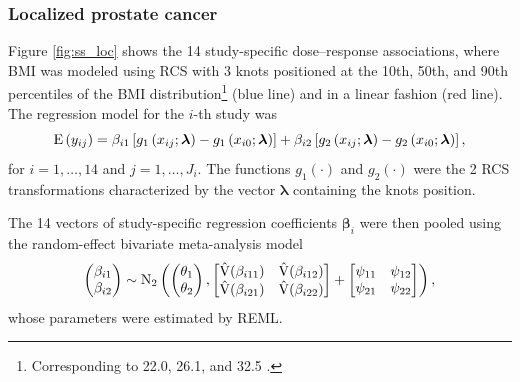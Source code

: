 \subsubsection{Localized prostate cancer}

Figure \ref{fig:ss_loc} shows the 14 study-specific dose--response associations, where BMI was modeled using RCS with 3 knots positioned at the 10th, 50th, and 90th percentiles of the BMI distribution\footnote{Corresponding to 22.0, 26.1, and 32.5 \kgmsq.} (blue line) and in a linear fashion (red line). The regression model for the $i$-th study  was
\begin{equation*}
\operatorname{E}\left(y_{ij}\right) = \beta_{i1} \left[ g_1 \left(x_{ij}; \boldsymbol{\lambda}\right) - g_1 \left(x_{i0}; \boldsymbol{\lambda}\right) \right] + \beta_{i2} \left[ g_2 \left(x_{ij}; \boldsymbol{\lambda}\right) - g_2 \left(x_{i0}; \boldsymbol{\lambda}\right) \right],
\end{equation*}
for $i=1,\ldots,14$ and $j=1,\ldots,J_i$. The functions $g_1(\cdot)$ and $g_2(\cdot)$ were the 2 RCS transformations characterized by the vector $ \boldsymbol{\lambda}$ containing the knots position.

The 14 vectors of study-specific regression coefficients $\boldsymbol{\beta}_i$ were then pooled using the random-effect bivariate meta-analysis model
\begin{equation*}
\begin{pmatrix}
\beta_{i1} \\ \beta_{i2}
\end{pmatrix} \sim \operatorname{N}_2 \left(
\begin{pmatrix}
\theta_{1} \\ \theta_{2}
\end{pmatrix}, 
\begin{bmatrix}
\hat{\mathrm{V}}(\beta_{i11}) & \hat{\mathrm{V}}(\beta_{i12}) \\
 \hat{\mathrm{V}}(\beta_{i21}) & \hat{\mathrm{V}}(\beta_{i22})
\end{bmatrix} + 
\begin{bmatrix}
\psi_{11} & \psi_{12} \\
 \psi_{21} & \psi_{22}
\end{bmatrix} \right),
\end{equation*}
whose parameters were estimated by REML.

